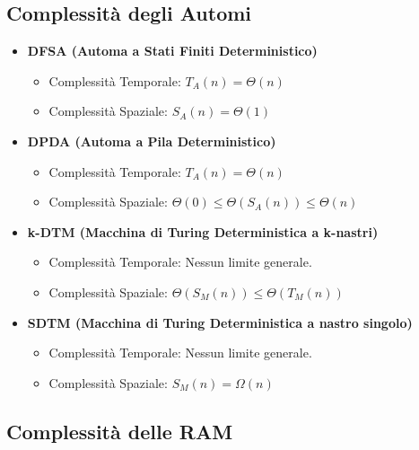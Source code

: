 \subsection{Complessità degli Automi}
\begin{itemize}
    \item \textbf{DFSA (Automa a Stati Finiti Deterministico)}
    \begin{itemize}
        \item Complessità Temporale: $T_A(n) = \Theta(n)$
        \item Complessità Spaziale: $S_A(n) = \Theta(1)$
    \end{itemize}

    \item \textbf{DPDA (Automa a Pila Deterministico)}
    \begin{itemize}
        \item Complessità Temporale: $T_A(n) = \Theta(n)$
        \item Complessità Spaziale: $\Theta(0) \le \Theta(S_A(n)) \le \Theta(n)$
    \end{itemize}

    \item \textbf{k-DTM (Macchina di Turing Deterministica a k-nastri)}
    \begin{itemize}
        \item Complessità Temporale: Nessun limite generale.
        \item Complessità Spaziale: $\Theta(S_M(n)) \le \Theta(T_M(n))$
    \end{itemize}

    \item \textbf{SDTM (Macchina di Turing Deterministica a nastro singolo)}
    \begin{itemize}
        \item Complessità Temporale: Nessun limite generale.
        \item Complessità Spaziale: $S_M(n) = \Omega(n)$
    \end{itemize}
\end{itemize}

\subsection{Complessità delle RAM}

